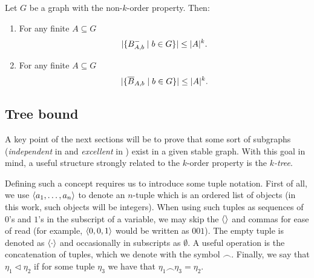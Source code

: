         \begin{corollary} \label{cor:k_order_propery_bounds_BAbs}
            Let $G$ be a graph with the non-$k$-order property.
            Then:
            \begin{enumerate}[label={\Roman*}., ref={\Roman*}, font=\rmfamily]
                \item\label{itm:k_order_propery_bounds_BAbs.1} For any finite $A \subseteq G$
                    \[
                        | \{ B^-_{A,b} \mid b \in G \} |
                            \leq |A|^k.
                    \]
                \item\label{itm:k_order_propery_bounds_BAbs.2} For any finite $A \subseteq G$
                    \[
                        | \{ \overline{B}_{A,b} \mid b \in G \} |
                            \leq |A|^k.
                    \]
            \end{enumerate}
        \end{corollary}

    \subsection{Tree bound} \label{subsec:subsection_3.3}

        A key point of the next sections will be to prove that some sort of  subgraphs
        (\emph{independent} in  and \emph{excellent} in ) exist in a given
        stable graph.
        With this goal in mind, a useful structure strongly related to the $k$-order property is the \emph{$k$-tree}.

        Defining such a concept requires us to introduce some tuple notation.
        First of all, we use $\left< a_1, \dots, a_n \right>$ to denote an $n$-tuple which is an ordered list of objects
        (in this work, such objects will be integers).
        When using such tuples as sequences of $0$'s and $1$'s in the subscript of a variable, we
        may skip the $\left<  \right>$ and commas for ease of read (for example, $\left< 0,0,1 \right>$ would be
        written as $001$).
        The empty tuple is denoted as $\left< \cdot \right>$ and occasionally in subscripts as $\emptyset$.
        A useful operation is the concatenation of tuples, which we denote with the symbol $\frown$.
        Finally, we say that $\eta_1 \triangleleft \eta_2$ if for some tuple $\eta_3$ we have that
        $\eta_1 \frown \eta_3 = \eta_2$.

